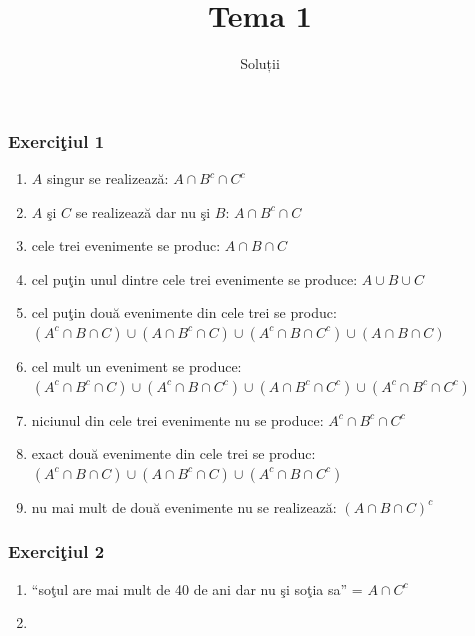 \documentclass[]{article}
\title{Tema 1}
\subtitle{Soluții}
\author{}
\date{}
\begin{document}
\maketitle

\thispagestyle{fancy}

\subsubsection{\texorpdfstring{Exerci\c tiul
1}{Exerciiul 1}}\label{exerciiul-1}

\begin{enumerate}
\def\labelenumi{\alph{enumi})}
\item
  \(A\) singur se realizeaz\u a: \(A\cap B^c\cap C^c\)
\item
  \(A\) \c si \(C\) se realizeaz\u a dar nu \c si \(B\):
  \(A\cap B^c\cap C\)
\item
  cele trei evenimente se produc: \(A\cap B\cap C\)
\item
  cel pu\c tin unul dintre cele trei evenimente se produce:
  \(A\cup B\cup C\)
\item
  cel pu\c tin dou\u a evenimente din cele trei se produc:
  \(\left(A^c\cap B\cap C\right)\cup\left(A\cap B^c\cap C\right)\cup\left(A^c\cap B\cap C^c\right)\cup\left(A\cap B\cap C\right)\)
\item
  cel mult un eveniment se produce:
  \(\left(A^c\cap B^c\cap C\right)\cup\left(A^c\cap B\cap C^c\right)\cup\left(A\cap B^c\cap C^c\right)\cup\left(A^c\cap B^c\cap C^c\right)\)
\item
  niciunul din cele trei evenimente nu se produce:
  \(A^c\cap B^c\cap C^c\)
\item
  exact dou\u a evenimente din cele trei se produc:
  \(\left(A^c\cap B\cap C\right)\cup\left(A\cap B^c\cap C\right)\cup\left(A^c\cap B\cap C^c\right)\)
\item
  nu mai mult de dou\u a evenimente nu se realizeaz\u a:
  \(\left(A\cap B\cap C\right)^c\)
\end{enumerate}

\subsubsection{\texorpdfstring{Exerci\c tiul
2}{Exerciiul 2}}\label{exerciiul-2}

\begin{enumerate}
\def\labelenumi{\alph{enumi})}
\item
  ``so\c tul are mai mult de 40 de ani dar nu \c si so\c tia sa'' =
  \(A\cap C^c\)
\item
\end{enumerate}
\end{document}
